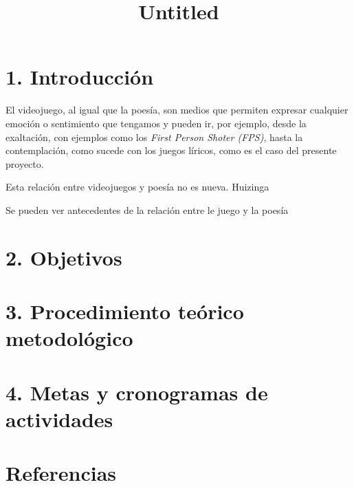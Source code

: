 \documentclass[
]{article}
\title{Untitled}
\author{}
\date{}
\begin{document}
\maketitle

\section{1. Introducción}\label{introducciuxf3n}

El videojuego, al igual que la poesía, son medios que permiten expresar
cualquier emoción o sentimiento que tengamos y pueden ir, por ejemplo,
desde la exaltación, con ejemplos como los \emph{First Person Shoter
(FPS)}, hasta la contemplación, como sucede con los juegos líricos, como
es el caso del presente proyecto.

Esta relación entre videojuegos y poesía no es nueva. Huizinga

Se pueden ver antecedentes de la relación entre le juego y la poesía

\section{2. Objetivos}\label{objetivos}

\section{3. Procedimiento teórico
metodológico}\label{procedimiento-teuxf3rico-metodoluxf3gico}

\section{4. Metas y cronogramas de
actividades}\label{metas-y-cronogramas-de-actividades}

\section{Referencias}\label{referencias}
\end{document}
